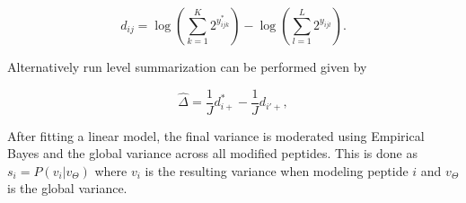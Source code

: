 \documentclass{mcp}
\def\secref#1{Section~\ref{#1}}
\begin{document}
\[
d_{ij} = \log \left( \sum_{k=1}^{K} 2^{y_{ijk}^{\ast}} \right) - \log \left( \sum_{l=1}^{L} 2^{y_{ijl}} \right).
\]

Alternatively run level summarization can be performed given by

\[
\hat{\Delta} = \frac{1}{J} d_{i+}^{\ast} - \frac{1}{J} d_{i'+},
\]

After fitting a linear model, the final variance is moderated using Empirical Bayes and the global variance across all modified peptides. This is done as $s_{i} = P(v_i| v_\Theta)$ where $v_i$ is the resulting variance when modeling peptide $i$ and $v_\Theta$ is the global variance.

%
%
%
%
\end{document}
